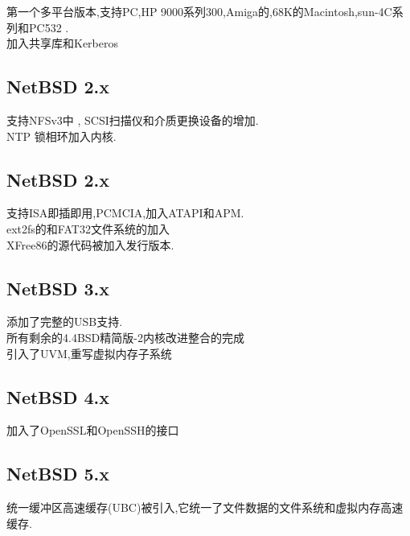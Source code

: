 \documentclass[a4paper,12pt,notitlepage]{article}
\begin{document}
	第一个多平台版本,支持PC,HP 9000系列300,Amiga的,68K的Macintosh,sun-4C系列和PC532 . \\
	
	加入共享库和Kerberos\\

\subsection{NetBSD 2.x}

	支持NFSv3中 , SCSI扫描仪和介质更换设备的增加. \\
	
	NTP 锁相环加入内核.\\

\subsection{NetBSD 2.x}

	支持ISA即插即用,PCMCIA,加入ATAPI和APM. \\
	
	ext2fs的和FAT32文件系统的加入 \\
	
	XFree86的源代码被加入发行版本. \\

\subsection{NetBSD 3.x}

	添加了完整的USB支持. \\
	
	所有剩余的4.4BSD精简版-2内核改进整合的完成 \\
	
	引入了UVM,重写虚拟内存子系统 \\

\subsection{NetBSD 4.x}

	加入了OpenSSL和OpenSSH的接口 \\

\subsection{NetBSD 5.x}

	统一缓冲区高速缓存(UBC)被引入,它统一了文件数据的文件系统和虚拟内存高速缓存. \\
	
\end{document}
